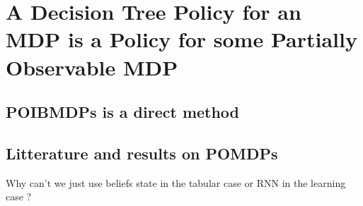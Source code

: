 \chapter{A Decision Tree Policy for an MDP is a Policy for some Partially Observable MDP}

\section{POIBMDPs is a direct method}
\section{Litterature and results on POMDPs}
Why can't we just use beliefs state in the tabular case or RNN in the learning case ?
